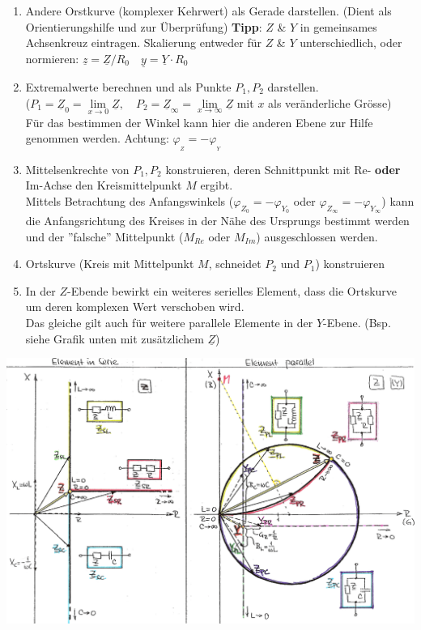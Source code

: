 \begin{enumerate}

  \item Andere Orstkurve (komplexer Kehrwert) als Gerade darstellen. (Dient als Orientierungshilfe und zur Überprüfung)
  \textbf{Tipp}: $Z$ \& $Y$ in gemeinsames 		
  	Achsenkreuz eintragen. Skalierung entweder für $Z$ \& $Y$ unterschiedlich, oder normieren: $\underline{z} = \underline{Z} / R_0 \quad \underline{y} = \underline{Y} \cdot R_0$
  
  \item Extremalwerte berechnen und als Punkte $P_1, P_2$ darstellen. \\
	($P_1 = \underline{Z}_0 = \lim\limits_{x \rightarrow 0}\underline{Z}, \quad
	  P_2 = \underline{Z}_\infty = \lim\limits_{x \rightarrow \infty}\underline{Z} $ mit $x$ als veränderliche Grösse)\\
	 Für das bestimmen der Winkel kann hier die anderen Ebene zur Hilfe genommen werden. Achtung: $\varphi_{_Z} = -\varphi_{_Y}$
	 
  \item Mittelsenkrechte von $P_1, P_2$ konstruieren, deren Schnittpunkt mit Re- \textbf{oder}
  Im-Achse den Kreismittelpunkt $M$ ergibt. \\
  Mittels Betrachtung des Anfangswinkels ($\varphi_{Z_0} = - \varphi_{Y_0}$  oder
  $\varphi_{Z_\infty} = - \varphi_{Y_\infty}$) kann die Anfangsrichtung des Kreises in
  der Nähe des Ursprungs bestimmt werden und der ''falsche'' Mittelpunkt ($M_{Re}$ oder $M_{Im}$)
  ausgeschlossen werden.
  \item Ortskurve (Kreis mit Mittelpunkt $M$, schneidet $P_2$ und $P_1$) konstruieren
  \item In der $Z$-Ebende bewirkt ein weiteres serielles Element, dass die Ortskurve um deren komplexen Wert verschoben wird.\\
  Das gleiche gilt auch für weitere parallele Elemente in der $Y$-Ebene. (Bsp. siehe Grafik unten mit zusätzlichem $\underline{Z}$)
\end{enumerate}

\includegraphics[width=18cm]{./images/impedanztrafo.png}